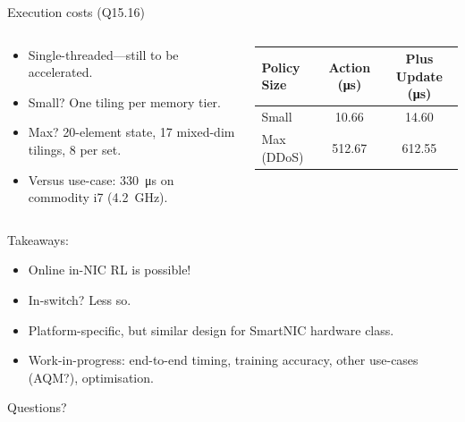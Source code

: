 \documentclass[aspectratio=169,xcolor={dvipsnames}
,handout
]{beamer}
\begin{document}

\begin{frame}{Execution costs (Q15.16)}
	\begin{columns}
		\begin{column}{0.4\linewidth}
			\begin{itemize}
				\item Single-threaded---still to be accelerated.
				\item Small? One tiling per memory tier.
				\item Max? 20-element state, 17 mixed-dim tilings, 8 per set.
				\item Versus use-case: \SI{330}{\micro\second} on commodity i7 (\SI{4.2}{\giga\hertz}).
			\end{itemize}
		\end{column}
		\begin{column}{0.6\linewidth}
			\centering
			\begin{tabular}{ l c c }
				\toprule
				Policy Size & Action (\si{\micro\second}) & Plus Update (\si{\micro\second}) \\ \midrule
				Small & \num{10.66} & \num{14.60} \\
				Max (DDoS) & \num{512.67} & \num{612.55} \\ \bottomrule
			\end{tabular}
		\end{column}
	\end{columns}
\end{frame}

\begin{frame}[standout]
	Takeaways:
	\begin{itemize}
		\item \alert{Online in-NIC RL is possible!}
		\item In-switch? Less so.
		\item Platform-specific, but similar design for SmartNIC hardware class.
		\item \alert{Work-in-progress}: end-to-end timing, training accuracy, other use-cases (AQM?), optimisation.
	\end{itemize}
	\alert{Questions?}
\end{frame}
\end{document}
